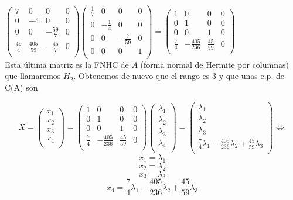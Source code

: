 \documentclass[11pt, a4paper]{article}
\newif\IfInSansMode
\theoremstyle{theorem-style}
\theoremstyle{definition-style}
\theoremstyle{remark-style}
\theoremstyle{example-style}
\begin{document}
$\begin{pmatrix}
7 & 0 & 0 & 0 \\
0 & -4 & 0 & 0 \\
0 & 0 & -\frac{59}{7} & 0 \\
\frac{49}{4} & \frac{405}{59} & -\frac{45}{7} & 0 \\
\end{pmatrix}
\begin{pmatrix}
\frac{1}{7} & 0 & 0 & 0 \\
0 & -\frac{1}{4} & 0 & 0 \\
0 & 0 & -\frac{7}{59} & 0 \\
0 & 0 & 0 & 1 \\
\end{pmatrix}    
 = 
\begin{pmatrix}
1 & 0 & 0 & 0 \\
0 & 1 & 0 & 0 \\
0 & 0 & 1 & 0 \\
\frac{7}{4} & -\frac{405}{236} & \frac{45}{59} & 0 \\
\end{pmatrix}$ \\

Esta última matriz es la FNHC de $A$ (forma normal de Hermite por columnas) que llamaremos $H_2$. Obtenemos de nuevo que el rango es 3 y que unas e.p. de C(A) son

$$X = \begin{pmatrix}
x_1  \\
x_2  \\
x_3  \\
x_4  \\
\end{pmatrix} = \begin{pmatrix}
1 & 0 & 0 & 0 \\
0 & 1 & 0 & 0 \\
0 & 0 & 1 & 0 \\
\frac{7}{4} & -\frac{405}{236} & \frac{45}{59} & 0 \\
\end{pmatrix} 
\begin{pmatrix}
\lambda_1  \\
\lambda_2  \\
\lambda_3  \\
\lambda_4  \\
\end{pmatrix} =
\begin{pmatrix}
\lambda_1  \\
\lambda_2  \\
\lambda_3  \\
\frac{7}{4}\lambda_1 - \frac{405}{236}\lambda_2 + \frac{45}{59}\lambda_3 \\
\end{pmatrix} \Leftrightarrow $$
$$x_1 = \lambda_1$$ 
$$x_2 = \lambda_2$$ 
$$x_3 = \lambda_3$$ 
$$x_4 = \frac{7}{4}\lambda_1 - \frac{405}{236}\lambda_2 + \frac{45}{59}\lambda_3 $$
\end{document}
